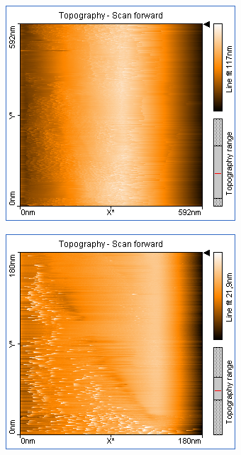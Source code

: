 \begin{figure}
    \begin{subfigure}[b]{\picwidth}
        \includegraphics[width=\textwidth]{data/Graphit/pic_02_01_600nm}
        \caption{}
        \label{fig:graphit_02_01}
    \end{subfigure}\qquad
    \begin{subfigure}[b]{\picwidth}
        \includegraphics[width=\textwidth]{data/Graphit/pic_02_02_180nm}

\end{subfigure}
\end{figure}

